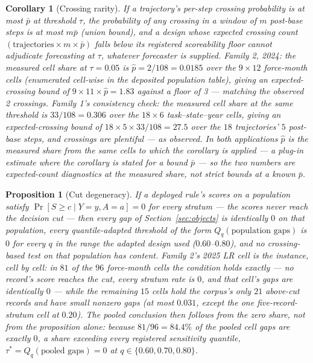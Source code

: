 \documentclass[11pt]{article}
\newtheorem{proposition}{Proposition}
\newtheorem{corollary}{Corollary}
\begin{document}
\begin{corollary}[Crossing rarity]
If a trajectory's per-step crossing probability is at most
$\bar p$ at threshold $\tau$, the probability of any crossing in a
window of $m$ post-base steps is at most $m \bar p$ (union bound),
and a design whose expected crossing count
$(\text{trajectories} \times m \times \bar p)$ falls below its
registered scoreability floor cannot adjudicate forecasting at
$\tau$, whatever forecaster is supplied. Family 2, 2024: the
measured cell share at $\tau = 0.05$ is $\hat p = 2/108 = 0.0185$
over the $9 \times 12$ force-month cells (enumerated cell-wise in
the deposited population table), giving an expected-crossing bound
of $9 \times 11 \times \hat p = 1.83$ against a floor of 3 ---
matching the observed 2 crossings. Family 1's consistency check: the measured cell share at the same threshold is $33/108 = 0.306$ over the $18 \times 6$ task--state--year cells, giving an expected-crossing bound of $18 \times 5 \times 33/108 = 27.5$ over the $18$ trajectories' $5$ post-base steps, and crossings are plentiful --- as observed. In both applications $\hat p$ is the measured share from the same cells to which the corollary is applied --- a plug-in estimate where the corollary is stated for a bound $\bar p$ --- so the two numbers are expected-count diagnostics at the measured share, not strict bounds at a known $\bar p$.
\end{corollary}

\begin{proposition}[Cut degeneracy]
If a deployed rule's scores on a population satisfy
$\Pr[S \ge c \mid Y{=}y, A{=}a] = 0$ for every stratum --- the
scores never reach the decision cut --- then every gap of
Section~\ref{sec:objects} is identically $0$ on that population,
every quantile-adapted threshold of the form
$Q_q(\text{population gaps})$ is $0$ for every $q$ in the range the
adapted design used ($0.60$--$0.80$), and no crossing-based test on
that population has content. Family 2's 2025 LR cell is the instance, cell by cell: in $81$ of the $96$ force-month cells the condition holds exactly --- no record's score reaches the cut, every stratum rate is $0$, and that cell's gaps are identically $0$ --- while the remaining $15$ cells hold the corpus's only $21$ above-cut records and have small nonzero gaps (at most $0.031$, except the one five-record-stratum cell at $0.20$). The pooled conclusion then follows from the zero share, not from the proposition alone: because $81/96 = 84.4\%$ of the pooled cell gaps are exactly $0$, a share exceeding every registered sensitivity quantile, $\tau^* = Q_q(\text{pooled gaps}) = 0$ at $q \in \{0.60, 0.70, 0.80\}$.
\end{proposition}
\end{document}
